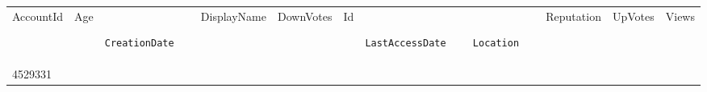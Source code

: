 \documentclass[12pt,a4paper,twoside,openright,titlepage,final]{article}
\begin{document}
\begin{enumerate}
	\begin{longtable}[]{@{}lllllllllll@{}}
		\label{tbl:mas_antiguo}\\
		\toprule
		\begin{minipage}[t]{0.05\columnwidth}\raggedright\strut
			AccountId
			\strut\end{minipage} &
		\begin{minipage}[t]{0.03\columnwidth}\raggedright\strut
			Age
			\strut\end{minipage} &
		\begin{minipage}[t]{0.11\columnwidth}\raggedright\strut
			\begin{verbatim}
			CreationDate
			\end{verbatim}
			\strut\end{minipage} &
		\begin{minipage}[t]{0.08\columnwidth}\raggedright\strut
			DisplayName
			\strut\end{minipage} &
		\begin{minipage}[t]{0.05\columnwidth}\raggedright\strut
			DownVotes
			\strut\end{minipage} &
		\begin{minipage}[t]{0.03\columnwidth}\raggedright\strut
			Id
			\strut\end{minipage} &
		\begin{minipage}[t]{0.11\columnwidth}\raggedright\strut
			\begin{verbatim}
			LastAccessDate
			\end{verbatim}
			\strut\end{minipage} &
		\begin{minipage}[t]{0.11\columnwidth}\raggedright\strut
			\begin{verbatim}
			Location
			\end{verbatim}
			\strut\end{minipage} &
		\begin{minipage}[t]{0.06\columnwidth}\raggedright\strut
			Reputation
			\strut\end{minipage} &
		\begin{minipage}[t]{0.04\columnwidth}\raggedright\strut
			UpVotes
			\strut\end{minipage} &
		\begin{minipage}[t]{0.04\columnwidth}\raggedright\strut
			Views
			\strut\end{minipage}\tabularnewline
		\begin{minipage}[t]{0.05\columnwidth}\raggedright\strut
			4529331
			\strut\end{minipage} &

\end{longtable}
\end{enumerate}
\end{document}

